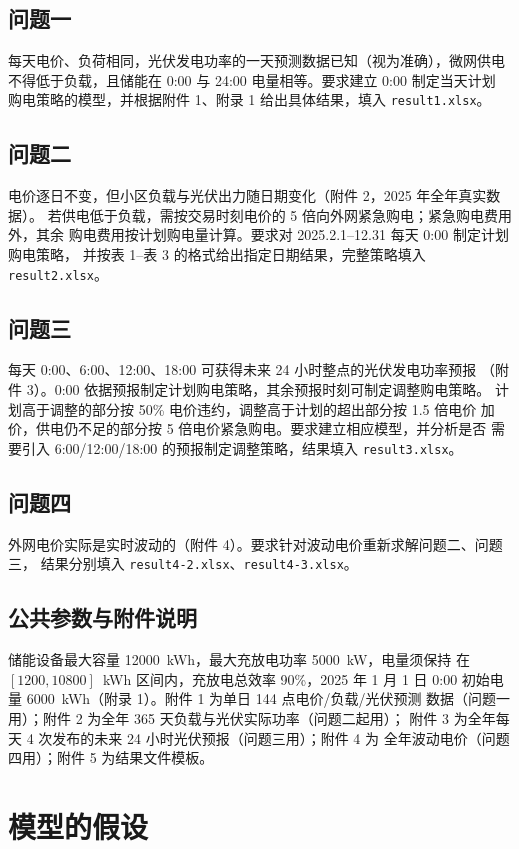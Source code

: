 \documentclass[withoutpreface,bwprint]{cumcmthesis}
\begin{document}
\subsection{问题一}
每天电价、负荷相同，光伏发电功率的一天预测数据已知（视为准确），微网供电
不得低于负载，且储能在 0:00 与 24:00 电量相等。要求建立 0:00 制定当天计划
购电策略的模型，并根据附件 1、附录 1 给出具体结果，填入 \texttt{result1.xlsx}。

\subsection{问题二}
电价逐日不变，但小区负载与光伏出力随日期变化（附件 2，2025 年全年真实数据）。
若供电低于负载，需按交易时刻电价的 5 倍向外网紧急购电；紧急购电费用外，其余
购电费用按计划购电量计算。要求对 2025.2.1--12.31 每天 0:00 制定计划购电策略，
并按表 1--表 3 的格式给出指定日期结果，完整策略填入 \texttt{result2.xlsx}。

\subsection{问题三}
每天 0:00、6:00、12:00、18:00 可获得未来 24 小时整点的光伏发电功率预报
（附件 3）。0:00 依据预报制定计划购电策略，其余预报时刻可制定调整购电策略。
计划高于调整的部分按 50\% 电价违约，调整高于计划的超出部分按 1.5 倍电价
加价，供电仍不足的部分按 5 倍电价紧急购电。要求建立相应模型，并分析是否
需要引入 6:00/12:00/18:00 的预报制定调整策略，结果填入 \texttt{result3.xlsx}。

\subsection{问题四}
外网电价实际是实时波动的（附件 4）。要求针对波动电价重新求解问题二、问题三，
结果分别填入 \texttt{result4-2.xlsx}、\texttt{result4-3.xlsx}。

\subsection{公共参数与附件说明}
储能设备最大容量 \num{12000}~kWh，最大充放电功率 \num{5000}~kW，电量须保持
在 $[1200,10800]$~kWh 区间内，充放电总效率 90\%，2025 年 1 月 1 日 0:00
初始电量 \num{6000}~kWh（附录 1）。附件 1 为单日 144 点电价/负载/光伏预测
数据（问题一用）；附件 2 为全年 365 天负载与光伏实际功率（问题二起用）；
附件 3 为全年每天 4 次发布的未来 24 小时光伏预报（问题三用）；附件 4 为
全年波动电价（问题四用）；附件 5 为结果文件模板。

\section{模型的假设}
\end{document}
